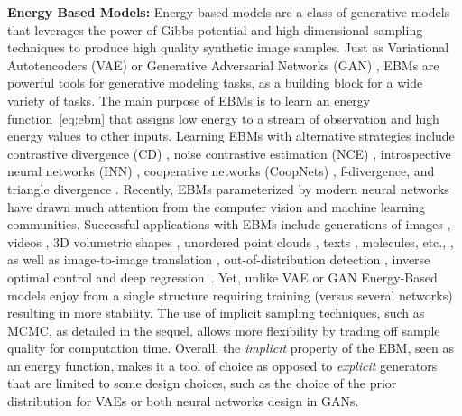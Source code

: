 \documentclass[letterpaper]{article} %
\begin{document}
\vspace{0.05in}\noindent\textbf{Energy Based Models: }
Energy based models \cite{lecun2006tutorial,ngiam2011learning} are a class of generative models that leverages the power of Gibbs potential and high dimensional sampling techniques to produce high quality synthetic image samples.
Just as Variational Autotencoders (VAE) \cite{kingma2013auto} or Generative Adversarial Networks (GAN) \cite{goodfellow2014generative}, EBMs are powerful tools for generative modeling tasks, as a building block for a wide variety of tasks. 
The main purpose of EBMs is to learn an energy function~\eqref{eq:ebm} that assigns low energy to a stream of observation and high energy values to other inputs.
Learning EBMs with alternative strategies include contrastive divergence (CD) \cite{hinton2002training,tieleman2008training}, noise contrastive estimation (NCE) \cite{gutmann2010noise,gao2020flow} , introspective neural networks (INN) \cite{lazarow2017introspective,jin2017introspective,lee2018wasserstein}, cooperative networks (CoopNets) \cite{xie2018cooperative,xie2020learning,xie2021cooperative}, f-divergence\cite{yu2020training}, and triangle divergence \cite{han2019divergence,han2020joint}.
Recently, EBMs parameterized by modern neural networks have drawn much attention from the computer vision and machine learning communities. Successful applications with EBMs include generations of images \cite{xie2016theory,gao2018learning,xie2018cooperative,du2019implicit}, videos \cite{XieCVPR17,xie2019learning}, 3D volumetric shapes \cite{xie2018learning,xie2020generative}, unordered point clouds \cite{xie2021GPointNet}, texts \cite{deng2020residual}, molecules, etc., \cite{ingraham2018learning,du2019energy}, as well as image-to-image translation \cite{xie2021cooperative,xie2021cycleCoopNets}, %
out-of-distribution detection \cite{ebmood2020}, inverse optimal control \cite{xu2019energy} and deep regression~\cite{gustafsson2020energy}.
Yet, unlike VAE or GAN Energy-Based models enjoy from a single structure requiring training (versus several networks) resulting in more stability.
The use of implicit sampling techniques, such as MCMC, as detailed in the sequel, allows more flexibility by trading off sample quality for computation time.
Overall, the \emph{implicit} property of the EBM, seen as an energy function, makes it a tool of choice as opposed to \emph{explicit} generators that are limited to some design choices, such as the choice of the prior distribution for VAEs or both neural networks design in GANs.
\end{document}
